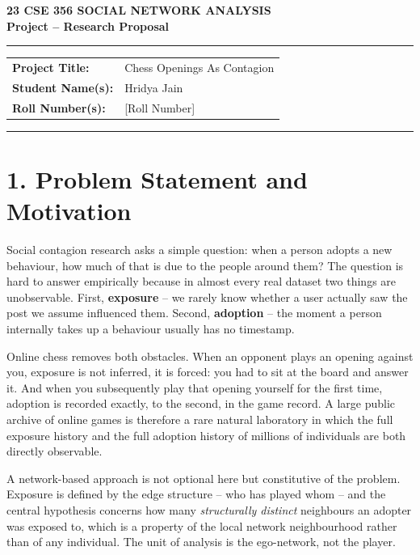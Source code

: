 \documentclass[11pt,a4paper]{article}
\begin{document}

\begin{center}
    {\Large \textbf{23 CSE 356 SOCIAL NETWORK ANALYSIS}}\\[3pt]
    {\large \textbf{Project -- Research Proposal}}\\[8pt]

    \rule{\textwidth}{0.5pt}
\end{center}

\begin{tabular}{@{}p{}p{}@{}}
\textbf{Project Title:} & Chess Openings As Contagion \\[3pt]
\textbf{Student Name(s):} & Hridya Jain \\[3pt]
\textbf{Roll Number(s):} & [Roll Number] \\[3pt]
\end{tabular}

\vspace{5pt}
\rule{\textwidth}{0.5pt}

\section*{1. Problem Statement and Motivation}

Social contagion research asks a simple question: when a person adopts a new
behaviour, how much of that is due to the people around them? The question is
hard to answer empirically because in almost every real dataset two things are
unobservable. First, \textbf{exposure} -- we rarely know whether a user actually
saw the post we assume influenced them. Second, \textbf{adoption} -- the moment a
person internally takes up a behaviour usually has no timestamp.

Online chess removes both obstacles. When an opponent plays an opening against
you, exposure is not inferred, it is forced: you had to sit at the board and
answer it. And when you subsequently play that opening yourself for the first
time, adoption is recorded exactly, to the second, in the game record. A large
public archive of online games is therefore a rare natural laboratory in which
the full exposure history and the full adoption history of millions of
individuals are both directly observable.

A network-based approach is not optional here but constitutive of the problem.
Exposure is defined by the edge structure -- who has played whom -- and the
central hypothesis concerns how many \textit{structurally distinct} neighbours an
adopter was exposed to, which is a property of the local network neighbourhood
rather than of any individual. The unit of analysis is the ego-network, not the
player.
\end{document}
